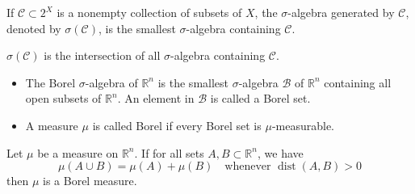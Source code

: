     \begin{definition}
        If $\mathcal{C}\subset 2^{X}$ is a nonempty collection of subsets of $X$, the $\sigma$-algebra generated by $\mathcal{C}$, denoted by $\sigma(\mathcal{C})$, is the smallest $\sigma$-algebra containing $\mathcal{C}$.
    \end{definition}

    \begin{remark}
        $\sigma(\mathcal{C})$ is the intersection of all $\sigma$-algebra containing $\mathcal{C}$.
    \end{remark}

    \begin{definition}
        \begin{itemize}
            \item[(i)] The Borel $\sigma$-algebra of $\mathbb{R}^{n}$ is the smallest $\sigma$-algebra $\mathscr{B}$ of $\mathbb{R}^{n}$ containing all open subsets of $\mathbb{R}^{n}$. An element in $\mathscr{B}$ is called a Borel set.
            \item[(ii)] A measure $\mu$ is called Borel if every Borel set is $\mu$-measurable.
        \end{itemize}
    \end{definition}

    \begin{theorem}\label{Caratheodory}
        Let $\mu$ be a measure on $\mathbb{R}^{n}$. If for all sets $A,B \subset \mathbb{R}^{n}$, we have 
        \begin{equation}
            \mu(A \cup B)=\mu(A)+\mu(B) \quad \text{whenever } \operatorname{dist}(A,B)>0
            \label{eq:caratheodory-additivity}
        \end{equation}
        then $\mu$ is a Borel measure.
    \end{theorem}

